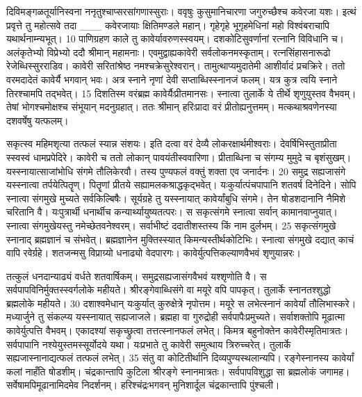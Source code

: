 दिविमङ्गळतूर्यानिस्वना ननृतुश्चाप्सरसांगणास्सुराः।
 ववृषुः कुसुमानिचारणा जगुरुच्छैश्च कवेरजा यशः।
 इत्थं प्रवृत्ते तु महोत्सवे तदा
___ कवेरजायाः क्षितिमण्डले महान्।
 गृहेगृहे भूगृहमेधिनां महो
विश्वंबराचापि यथार्थनाम्न्यभूत्।
 10 पाणिग्रहण काले तु कावेर्यावरुणस्स्वयम्।
 दशकोटिसुवर्णानां रत्नानि विविधानि च।
 अलंकृतेभ्यो विप्रेभ्यो ददौ श्रीमान् महामनाः।
 एवमुद्वाह्यकावेरी सर्वलोकनमस्कृताम्।
 रत्नसिंहासनारूढो रेजेब्धिस्सुरराडिव।
 कावेरी सरितांश्रेष्ठ नमश्चक्रेसुरेश्वरान्।
 तामुत्थाप्यमुदातेमी आशीर्वादं प्रचक्रिरे।
 ततो वरमदादेतं कावेर्यै भगवान् भवः।
 अत्र स्नाने नृणां देवी सप्ताब्धिस्स्नानजं फलम्।
 यत्र कुत्र त्वयि स्नाने तिरश्चामपि तद्भवेत्।
 15 दिशतिस्म वरंब्रह्म कावेर्यैःप्रीतमानसः।
 स्नात्वा तुलार्के ये तीर्थे शृणुयुस्तव वैभवम्।
 तेषां भोगश्चमोक्षश्च संभूयान् मदनुग्रहात्।
 ततः श्रीमान् हरिःप्रादा वरं प्रीतोह्यनुत्तमम्।
 मत्कथाश्रवणेनस्या दशवर्षेषु यत्फलम्।
 
सकृत्स्व महिमशृत्या तत्फलं स्यान्न संशयः।
 इति दत्वा वरं देव्यै लोकरक्षार्थमीश्वराः।
 देवर्षिभिस्तुताप्रीता स्स्वस्वं धामप्रपेदिरे।
 कावेरी च ततो लोकान् पावयंतीस्ववारिणा।
 प्रीताब्धिना च संगम्य मुमुदे च बृशंसुखम्।
 यस्स्नायात्साजांभोधि संगमे तौलिकेरवौ।
 तस्य पुण्यफलं वक्तुं शक्ता एव जनार्दनः।
 20 समुद्र सह्यजासंगे यस्स्नात्वा तर्पयेत्पितॄण्।
 पितॄणां प्रीतये सह्यामलकश्राद्धकृद्भवेत्।
 यःकुर्यात्पंचपापानि शतवर्ष दिनेदिने।
 सोपि स्नात्वा संगमुखे मुच्यते सर्वकिल्बिषैः।
 सूर्यग्रहे तु यस्स्नायात् कावेर्यांबुधि संगमे।
 तेन षोडशदानानि नैमिशे चरितानि वै।
 यःपुत्रार्थी धनार्थीच कन्यार्थ्यायुष्यतत्परः।
 स सकृत्संगमे स्नात्वा सर्वान् कामानवाप्नुयात्।
 स्नात्वा संगमुखेयस्तु नमेच्छेतवनेश्वरम्।
 सर्वाभीष्टं ददातीशस्तस्य किं नाम दुर्लभम्।
 25 सकृत्संगमुखे स्नानाद् ब्रह्मज्ञानं च संभवेत्।
 ब्रह्मज्ञानेन मुक्तिस्स्यात् किमन्यस्तीर्थकोटिभिः।
 स्नात्वा संगमुखे दद्यात् काचं वापि रवेर्ग्रहे।
 शतजन्मसु विप्राग्र्यो धनाढ्यो वेदपारगः।
 कावेर्युत्पत्तिकल्याणवैभवं शृणुयान्नरः।
 
तत्कुलं धनदान्याढ्यं वर्धते शतवार्षिकम्।
 समुद्रसह्यजासंगवैभवं यश्शृणोति वै।
 स सर्वपापविनिर्मुक्तस्स्वर्गलोके महीयते।
 श्रीरङ्गेवाब्धिसंगे वा मयूरे वपि पापकृत्।
 तुलार्के स्नानतश्शुद्धो ब्रह्मलोके महीयते।
 30 दशाश्वमेधान् यःकुर्यात् कुरुक्षेत्रे नृपोत्तम।
 मयूरे स लभेत्स्नानं कावेर्यां तौलिभास्करे।
 मध्यार्जुने तु संकल्प्य यस्स्नायात् सह्यजाजले।
 ब्रह्महा वा गुरुद्रोही सर्वपापैःप्रमुच्यते।
 सर्वाशक्तोपि मूढात्मा कावेर्युत्पत्ति वैभवम्।
 एकादश्यां सकृच्छ्रुत्वा तत्तत्स्नानफलं लभेत्।
 किमत्र बहुनोक्तेन कावेरीस्मृतिमात्रतः।
 सर्वपापानि नश्येयुस्तमस्सूर्योदये यथा।
 यःप्रभाते तु कावेरी समुत्थाय त्रिरुच्चरेत्।
 तुलार्के सह्यजास्नानाद्यत्फलं तत्फलं लभेत्।
 35 संतु वा कोटितीर्थानि दिव्यपुण्यस्थलान्यपि।
 रङ्गेस्नानस्य कावेर्यां कलां नाहँति षोडशीम्।
 चंद्रकान्तापि कुटिला श्रीरङ्गे स्नानमात्रतः।
 सर्वपापविशुद्धा सा ब्रह्मलोकं जगामह।
 सर्वेषामपिमूढानामिदमेव निदर्शनम्।
 हरिश्चंद्रःभगवन् मुनिशार्दूल चंद्रकान्तापि पुंश्चली।
 
